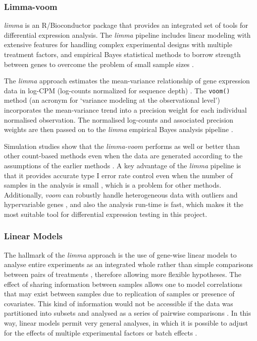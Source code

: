         
        \subsubsection{Limma-voom}
        \textit{limma} is an R/Bioconductor package \cite{Ritchie2015LimmaStudies, smyth2004linear}  that provides an integrated set of tools for differential expression analysis. The \textit{limma} pipeline includes linear modeling with extensive features for handling complex experimental designs with multiple treatment factors, and empirical Bayes statistical methods to borrow strength between genes to overcome the problem of small sample sizes \cite{Ritchie2015LimmaStudies}.

        The \textit{limma} approach estimates the mean-variance relationship of gene expression data in log-CPM  (log-counts normalized for sequence depth) \cite{Law2014}. The \texttt{voom()} method (an acronym for ‘variance modeling at the observational level’) incorporates the mean-variance trend into a precision weight for each individual normalised observation. The normalised log-counts and associated precision weights are then passed on to the \textit{limma} empirical Bayes analysis pipeline \cite{Law2014}.
        
        Simulation studies show that the \textit{limma-voom} performs as well or better than other count-based methods even when the data are generated according to the assumptions of the earlier methods  \cite{Law2014}. A key advantage of the \textit{limma} pipeline is that it provides accurate type I error rate control even when the number of samples in the analysis is small \cite{SmythLimma:Guide}, which is a problem for other methods. Additionally, \textit{voom} can robustly handle heterogeneous data with outliers and hypervariable genes \cite{phipson2013empirical}, and also the analysis run-time is fast, which makes it the most suitable tool for differential expression testing in this project. 
        
        \subsubsection{Linear Models}
        
        The hallmark of the \textit{limma} approach is the use of gene-wise linear models to analyse entire experiments as an integrated whole rather than simple comparisons between pairs of treatments  \cite{Ritchie2015LimmaStudies}, therefore allowing more flexible hypotheses. The effect of sharing information between samples allows one to model correlations that may exist between samples due to replication of samples or presence of covariates. This kind of information would not be accessible if the data was partitioned into subsets and analysed as a series of pairwise comparisons \cite{Love2016RNA-SeqApproved}. In this way, linear models permit very general analyses, in which it is possible to adjust for the effects of multiple experimental factors or batch effects  \cite{Ritchie2015LimmaStudies}.
        
